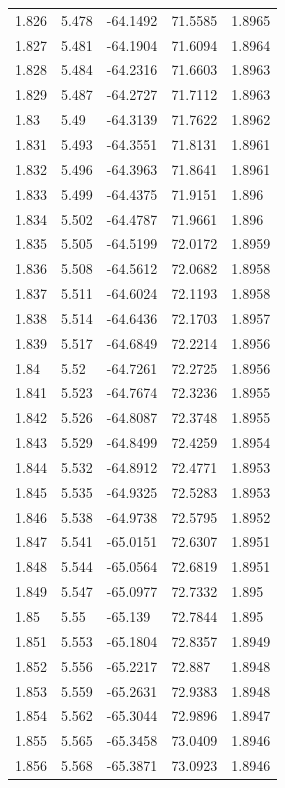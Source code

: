 \begin{tabular}{lllll}
1.826 & 5.478 & -64.1492 & 71.5585 & 1.8965 \\
1.827 & 5.481 & -64.1904 & 71.6094 & 1.8964 \\
1.828 & 5.484 & -64.2316 & 71.6603 & 1.8963 \\
1.829 & 5.487 & -64.2727 & 71.7112 & 1.8963 \\
1.83 & 5.49 & -64.3139 & 71.7622 & 1.8962 \\
1.831 & 5.493 & -64.3551 & 71.8131 & 1.8961 \\
1.832 & 5.496 & -64.3963 & 71.8641 & 1.8961 \\
1.833 & 5.499 & -64.4375 & 71.9151 & 1.896 \\
1.834 & 5.502 & -64.4787 & 71.9661 & 1.896 \\
1.835 & 5.505 & -64.5199 & 72.0172 & 1.8959 \\
1.836 & 5.508 & -64.5612 & 72.0682 & 1.8958 \\
1.837 & 5.511 & -64.6024 & 72.1193 & 1.8958 \\
1.838 & 5.514 & -64.6436 & 72.1703 & 1.8957 \\
1.839 & 5.517 & -64.6849 & 72.2214 & 1.8956 \\
1.84 & 5.52 & -64.7261 & 72.2725 & 1.8956 \\
1.841 & 5.523 & -64.7674 & 72.3236 & 1.8955 \\
1.842 & 5.526 & -64.8087 & 72.3748 & 1.8955 \\
1.843 & 5.529 & -64.8499 & 72.4259 & 1.8954 \\
1.844 & 5.532 & -64.8912 & 72.4771 & 1.8953 \\
1.845 & 5.535 & -64.9325 & 72.5283 & 1.8953 \\
1.846 & 5.538 & -64.9738 & 72.5795 & 1.8952 \\
1.847 & 5.541 & -65.0151 & 72.6307 & 1.8951 \\
1.848 & 5.544 & -65.0564 & 72.6819 & 1.8951 \\
1.849 & 5.547 & -65.0977 & 72.7332 & 1.895 \\
1.85 & 5.55 & -65.139 & 72.7844 & 1.895 \\
1.851 & 5.553 & -65.1804 & 72.8357 & 1.8949 \\
1.852 & 5.556 & -65.2217 & 72.887 & 1.8948 \\
1.853 & 5.559 & -65.2631 & 72.9383 & 1.8948 \\
1.854 & 5.562 & -65.3044 & 72.9896 & 1.8947 \\
1.855 & 5.565 & -65.3458 & 73.0409 & 1.8946 \\
1.856 & 5.568 & -65.3871 & 73.0923 & 1.8946 \\

\end{tabular}
